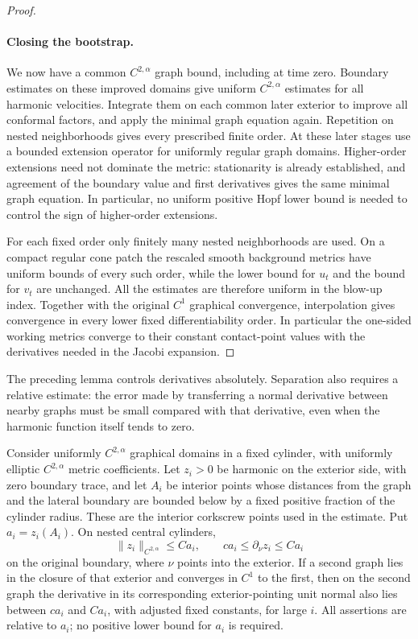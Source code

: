 \begin{proof}
\paragraph{Closing the bootstrap.}
We now have a common $C^{2,\alpha}$ graph bound, including at time
zero. Boundary estimates on these improved domains give uniform
$C^{2,\alpha}$ estimates for all harmonic velocities. Integrate them
on each common later exterior to improve all conformal factors, and
apply the minimal graph equation again. Repetition on nested
neighborhoods gives every prescribed finite order. At these later
stages use a bounded extension operator for uniformly regular graph
domains. Higher-order extensions need not dominate the metric:
stationarity is already established, and agreement of the boundary
value and first derivatives gives the same minimal graph equation.
In particular, no uniform positive Hopf lower bound is needed to
control the sign of higher-order extensions.

For each fixed order only finitely many nested neighborhoods are used.
On a compact regular cone patch the rescaled smooth background metrics
have uniform bounds of every such order, while the lower bound for
$u_t$ and the bound for $v_t$ are unchanged. All the estimates are
therefore uniform in the blow-up index. Together with the original
$C^1$ graphical convergence, interpolation gives convergence in every
lower fixed differentiability order. In particular the one-sided
working metrics converge to their constant contact-point values with
the derivatives needed in the Jacobi expansion.
\end{proof}

The preceding lemma controls derivatives absolutely. Separation also
requires a relative estimate: the error made by transferring a normal
derivative between nearby graphs must be small compared with that
derivative, even when the harmonic function itself tends to zero.

\begin{lemma}
\label{lem:rpi:relative-harmonic}
Consider uniformly $C^{2,\alpha}$ graphical domains in a fixed
cylinder, with uniformly elliptic $C^{2,\alpha}$ metric coefficients.
Let $z_i>0$ be harmonic on the exterior side, with zero boundary trace,
and let $A_i$ be interior points whose distances from the graph and
the lateral boundary are bounded below by a fixed positive fraction of
the cylinder radius. These are the interior corkscrew points used in
the estimate. Put
$a_i=z_i(A_i)$. On nested central cylinders,
\[
 \|z_i\|_{C^{2,\alpha}}\le C a_i,
 \qquad c a_i\le\partial_\nu z_i\le C a_i
\]
on the original boundary, where $\nu$ points into the exterior.
If a second graph lies in the closure of that exterior and converges
in $C^1$ to the first, then on the second graph the derivative in its
corresponding exterior-pointing unit normal also lies between
$c a_i$ and $C a_i$, with adjusted fixed constants, for large $i$.
All assertions are relative to $a_i$; no positive lower bound for
$a_i$ is required.
\end{lemma}

